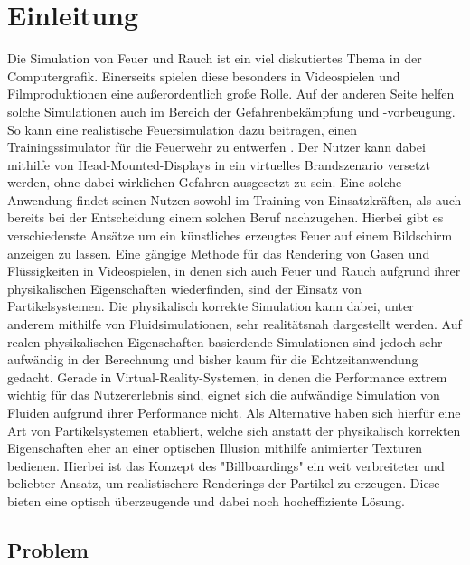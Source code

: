 \section{Einleitung}
\noindent

Die Simulation von Feuer und Rauch ist ein viel diskutiertes Thema in der Computergrafik. Einerseits
spielen diese besonders in Videospielen und Filmproduktionen eine außerordentlich große Rolle. Auf der
anderen Seite helfen solche Simulationen auch im Bereich der Gefahrenbekämpfung und -vorbeugung.
So kann eine realistische Feuersimulation dazu beitragen, einen Trainingssimulator für die Feuerwehr zu
entwerfen \parencite{Schlager2017}. Der Nutzer kann dabei mithilfe von Head-Mounted-Displays in ein virtuelles Brandszenario versetzt werden,
ohne dabei wirklichen Gefahren ausgesetzt zu sein. Eine solche Anwendung findet seinen Nutzen sowohl im Training
von Einsatzkräften, als auch bereits bei der Entscheidung einem solchen Beruf nachzugehen.
Hierbei gibt es verschiedenste Ansätze um ein künstliches erzeugtes Feuer auf einem
Bildschirm anzeigen zu lassen. Eine gängige Methode für das Rendering von Gasen und Flüssigkeiten
in Videospielen, in denen sich auch Feuer und Rauch aufgrund ihrer physikalischen Eigenschaften
wiederfinden, sind der Einsatz von Partikelsystemen. Die physikalisch korrekte Simulation kann dabei,
unter anderem mithilfe von Fluidsimulationen, sehr realitätsnah dargestellt werden.
Auf realen physikalischen Eigenschaften basierdende Simulationen sind jedoch sehr aufwändig in der
Berechnung und bisher kaum für die Echtzeitanwendung gedacht.
Gerade in Virtual-Reality-Systemen, in denen die Performance extrem wichtig für das Nutzererlebnis sind,
eignet sich die aufwändige Simulation von Fluiden aufgrund ihrer Performance nicht. Als Alternative haben
sich hierfür eine Art von Partikelsystemen etabliert, welche sich anstatt der physikalisch korrekten
Eigenschaften eher an einer optischen Illusion mithilfe animierter Texturen bedienen.
Hierbei ist das Konzept des "Billboardings" ein weit verbreiteter und beliebter Ansatz,
um realistischere Renderings der Partikel zu erzeugen. Diese bieten eine optisch überzeugende und
dabei noch hocheffiziente Lösung.



\subsection{Problem}


